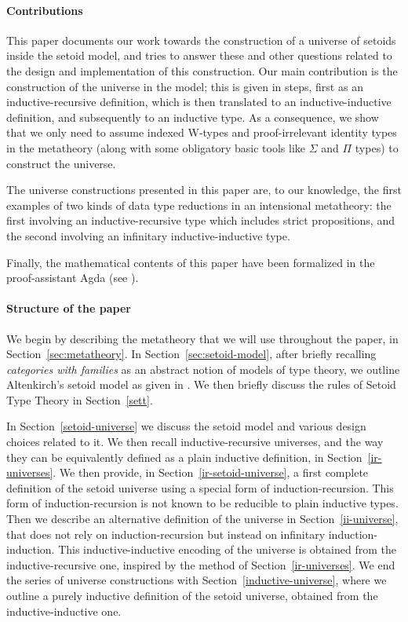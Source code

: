 \documentclass[autoref]{llncs}
\begin{document}
\paragraph*{Contributions}

This paper documents our work towards the construction of a universe of setoids
inside the setoid model, and tries to answer these and other questions related
to the design and implementation of this construction. Our main contribution is
the construction of the universe in the model; this is given in steps, first as
an inductive-recursive definition, which is then translated to an
inductive-inductive definition, and subsequently to an inductive type. As a
consequence, we show that we only need to assume indexed W-types and
proof-irrelevant identity types in the metatheory (along with some obligatory
basic tools like $\Sigma$ and $\Pi$ types) to construct the universe.

The universe constructions presented in this paper are, to our knowledge, the
first examples of two kinds of data type reductions in an intensional
metatheory: the first involving an inductive-recursive type which includes
strict propositions, and the second involving an infinitary inductive-inductive
type.

Finally, the mathematical contents of this paper have been formalized in the
proof-assistant Agda (see \cite{agda-code}).

\paragraph*{Structure of the paper}

We begin by describing the metatheory that we will use throughout the paper, in
Section~\ref{sec:metatheory}. In Section~\ref{sec:setoid-model}, after briefly
recalling \emph{categories with families} as an abstract notion of models of
type theory, we outline Altenkirch's setoid model as given in \cite{mpc19}. We
then briefly discuss the rules of Setoid Type Theory in Section~\ref{sett}.

In Section~\ref{setoid-universe} we discuss the setoid model and various design
choices related to it. We then recall inductive-recursive universes, and the way
they can be equivalently defined as a plain inductive definition, in
Section~\ref{ir-universes}.
%
We then provide, in Section~\ref{ir-setoid-universe}, a first complete
definition of the setoid universe using a special form of induction-recursion.
This form of induction-recursion is not known to be reducible to plain inductive types.
Then we describe an alternative definition of the universe in
Section~\ref{ii-universe}, that does not rely on induction-recursion but instead
on infinitary induction-induction. This inductive-inductive encoding of the
universe is obtained from the inductive-recursive one, inspired by the method of
Section~\ref{ir-universes}.
%
We end the series of universe constructions with
Section~\ref{inductive-universe}, where we outline a purely inductive definition
of the setoid universe, obtained from the inductive-inductive one.
\end{document}
